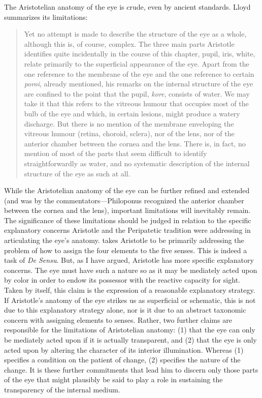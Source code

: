 The Aristotelian anatomy of the eye is crude, even by ancient standards. Lloyd summarizes its limitations:
\begin{quote}
	Yet no attempt is made to describe the structure of the eye as a whole, although this is, of course, complex. The three main parts Aristotle identifies quite incidentally in the course of this chapter, pupil, iris, white, relate primarily to the superficial appearance of the eye. Apart from the one reference to the membrane of the eye and the one reference to certain \emph{poroi}, already mentioned, his remarks on the internal structure of the eye are confined to the point that the pupil, \emph{kore}, consists of water. We may take it that this refers to the vitreous humour that occupies most of the bulb of the eye and which, in certain lesions, might produce a watery discharge. But there is no mention of the membrane enveloping the vitreous humour (retina, choroid, sclera), nor of the lens, nor of the anterior chamber between the cornea and the lens. There is, in fact, no mention of most of the parts that seem difficult to identify straightforwardly as water, and no systematic description of the internal structure of the eye as such at all. \citep[220--221]{Lloyd:1978fk}
\end{quote}
While the Aristotelian anatomy of the eye can be further refined and extended (and was by the commentators---Philoponus recognized the anterior chamber between the cor\-nea and the lens), important limitations will inevitably remain. The significance of these limitations should be judged in relation to the specific explanatory concerns Aristotle and the Peripatetic tradition were addressing in articulating the eye's anatomy. \citet{Lloyd:1978fk} takes Aristotle to be primarily addressing the problem of how to assign the four elements to the five senses. This is indeed a task of \emph{De Sensu}. But, as I have argued, Aristotle has more specific explanatory concerns. The eye must have such a nature so as it may be mediately acted upon by color in order to endow its possessor with the reactive capacity for sight. Taken by itself, this claim is the expression of a reasonable explanatory strategy. If Aristotle's anatomy of the eye strikes us as superficial or schematic, this is not due to this explanatory strategy alone, nor is it due to an abstract taxonomic concern with assigning elements to senses. Rather, two further claims are responsible for the limitations of Aristotelian anatomy: (1) that the eye can only be mediately acted upon if it is actually transparent, and (2) that the eye is only acted upon by altering the character of its interior illumination. Whereas (1) specifies a condition on the patient of change, (2) specifies the nature of the change. It is these further commitments that lead him to discern only those parts of the eye that might plausibly be said to play a role in sustaining the transparency of the internal medium.


